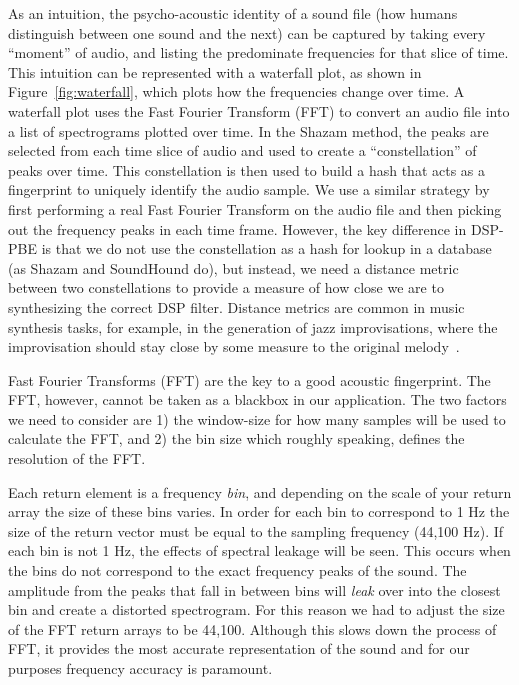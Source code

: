 As an intuition, the psycho-acoustic identity of a sound file (how humans distinguish between one sound and the next) can be captured by taking every ``moment'' of audio, and listing the predominate frequencies for that slice of time.
This intuition can be represented with a waterfall plot, as shown in Figure~\ref{fig:waterfall}, which plots how the frequencies change over time.
A waterfall plot uses the Fast Fourier Transform (FFT) to convert an audio file into a list of spectrograms plotted over time.
In the Shazam method, the peaks are selected from each time slice of audio and used to create a ``constellation'' of peaks over time. 
This constellation is then used to build a hash that acts as a fingerprint to uniquely identify the audio sample.
We use a similar strategy by first performing a real Fast Fourier Transform on the audio file and then picking out the frequency peaks in each time frame.
However, the key difference in DSP-PBE is that we do not use the constellation as a hash for lookup in a database (as Shazam and SoundHound do), but instead, we need a distance metric between two constellations to provide a measure of how close we are to synthesizing the correct DSP filter.
Distance metrics are common in music synthesis tasks, for example, in the generation of jazz improvisations, where the improvisation should stay close by some measure to the original melody~\cite{donze2014machine}.

Fast Fourier Transforms (FFT) are the key to a good acoustic fingerprint.
The FFT, however, cannot be taken as a blackbox in our application.
The two factors we need to consider are 1) the window-size for how many samples will be used to calculate the FFT, and 2) the bin size which roughly speaking, defines the resolution of the FFT.

Each return element is a frequency \textit{bin}, and depending on the scale of your return array the size of these bins varies.
In order for each bin to correspond to 1 Hz the size of the return vector must be equal to the sampling frequency (44,100 Hz).
If each bin is not 1 Hz, the effects of spectral leakage will be seen.
This occurs when the bins do not correspond to the exact frequency peaks of the sound.
The amplitude from the peaks that fall in between bins will \textit{leak} over into the closest bin and create a distorted spectrogram.
For this reason we had to adjust the size of the FFT return arrays to be 44,100.
Although this slows down the process of FFT, it provides the most accurate representation of the sound and for our purposes frequency accuracy is paramount.

